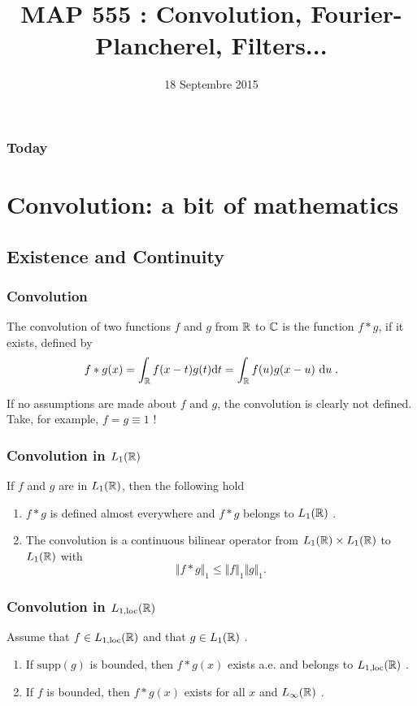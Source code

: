 

\title{MAP 555 : Convolution, Fourier-Plancherel, Filters...}

\date{18 Septembre 2015}
\maketitle



\begin{frame}
\frametitle{Today}
\tableofcontents
\end{frame}

\section{Convolution: a bit of mathematics}
\subsection{Existence and Continuity}
\begin{frame}
\frametitle{Convolution}
\begin{definition}
The convolution of two functions $f$ and $g$ from $\mathbb{R}$ to $\mathbb{C}$ is the function $f*g$, if it exists, defined by
$$
f*g(x)=\int_{\mathbb{R}}f(x-t)g(t) \mathrm{d} t=\int_{\mathbb{R}}f(u)g(x-u)\ \mathrm{d} u \;.
$$
\end{definition}
If no assumptions are made about $f$ and $g$, the convolution is clearly not defined. Take, for example, $f=g \equiv 1$ !
\end{frame}

\begin{frame}
\frametitle{Convolution in $L_1(\mathbb{R})$}
\begin{theorem}
If $f$ and $g$ are in $L_1(\mathbb{R})$,  then the following hold
\begin{enumerate}[label=(\roman*)]
\item $f*g$ is  defined almost everywhere and $f*g$  belongs to $L_1(\mathbb{R})$ .
\item The convolution is a  continuous bilinear operator from $L_1(\mathbb{R}) \times L_1(\mathbb{R})$  to $L_1(\mathbb{R})$  with
$$
\Vert f*g\Vert_{1}\leq\Vert f\Vert_{1}\Vert g\Vert_{1}.
$$
\end{enumerate}
\end{theorem}
\end{frame}

\begin{frame}
\frametitle{Convolution in $L_{1,\mathrm{loc}}(\mathbb{R})$}
\begin{theorem}
Assume that $f\in L_{1,\mathrm{loc}}(\mathbb{R})$ and that $ g\in L_1(\mathbb{R})$ .
\begin{enumerate}[label=(\roman*)]
\item If $\mathrm{supp}(g)$ is bounded,  then $f*g(x)$ exists a.e. and belongs to $L_{1,\mathrm{loc}}(\mathbb{R})$ .
\item If $f$  is bounded,  then $f*g(x)$ exists for all $x$ and  $L_\infty(\mathbb{R})$ .
\end{enumerate}
\end{theorem}
\end{frame}


